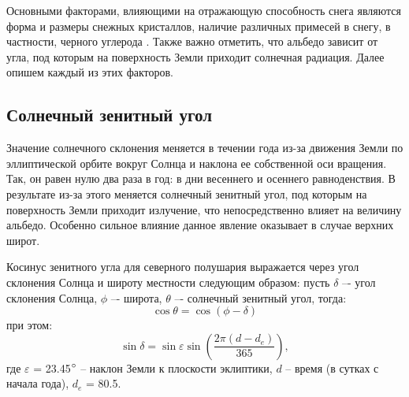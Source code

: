 \documentclass[a4paper, fontsize=14pt]{scrartcl}
\begin{document}
Основными факторами, влияющими на отражающую способность снега являются форма и размеры снежных кристаллов, наличие различных примесей в снегу, в частности, черного углерода \cite{Bak2019}. Также важно отметить, что альбедо зависит от угла, под которым на поверхность Земли приходит солнечная радиация. Далее опишем каждый из этих факторов.


\subsection{Солнечный зенитный угол}

Значение солнечного склонения меняется в течении года из-за движения Земли по эллиптической орбите вокруг Солнца и наклона ее собственной оси вращения. Так, он равен нулю два раза в год: в дни весеннего и осеннего равноденствия. В результате из-за этого меняется солнечный зенитный угол, под которым на поверхность Земли приходит излучение, что непосредственно влияет на величину альбедо. Особенно сильное влияние данное явление оказывает в случае верхних широт. 

Косинус зенитного угла для северного полушария выражается через угол склонения Солнца и широту местности следующим образом: пусть $\delta$ –- угол склонения Солнца, $\phi$ –- широта, $\theta$ –- солнечный зенитный угол, тогда:
\begin{equation}
    \cos \theta = \cos ( \phi - \delta ) \label{sys}
\end{equation}
при этом:
\begin{equation}
    \sin \delta = \sin \varepsilon \sin \left(\dfrac{2 \pi (d - d_e)}{365} \right) ,  \label{sys}
\end{equation}
где $\varepsilon$ = 23.45$\degree$  – наклон Земли к плоскости эклиптики, $d$ – время (в сутках с начала года), $d_e$ = 80.5.
\end{document}
